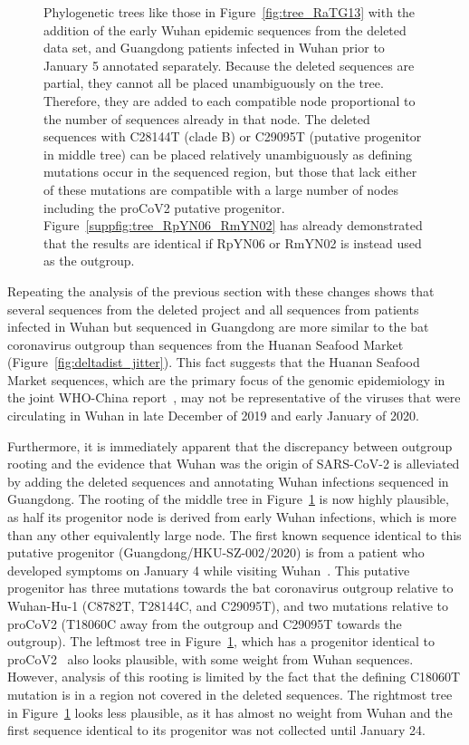 \documentclass[9pt,twocolumn,twoside]{gsajnl_modified}
\begin{document}
\begin{figure}
{ }
 \caption{
Phylogenetic trees like those in Figure~\ref{fig:tree_RaTG13} with the addition of the early Wuhan epidemic sequences from the deleted data set, and Guangdong patients infected in Wuhan prior to January 5 annotated separately.
Because the deleted sequences are partial, they cannot all be placed unambiguously on the tree.
Therefore, they are added to each compatible node proportional to the number of sequences already in that node.
The deleted sequences with C28144T (clade B) or C29095T (putative progenitor in middle tree) can be placed relatively unambiguously as defining mutations occur in the sequenced region, but those that lack either of these mutations are compatible with a large number of nodes including the proCoV2 putative progenitor.
 Figure~\ref{suppfig:tree_RpYN06_RmYN02} has already demonstrated that the results are identical if RpYN06 or RmYN02 is instead used as the outgroup.
\label{fig:tree_with_deleted}
 }
 \end{figure}

Repeating the analysis of the previous section with these changes shows that several sequences from the deleted project and all sequences from patients infected in Wuhan but sequenced in Guangdong are more similar to the bat coronavirus outgroup than sequences from the Huanan Seafood Market (Figure~\ref{fig:deltadist_jitter}).
This fact suggests that the Huanan Seafood Market sequences, which are the primary focus of the genomic epidemiology in the joint WHO-China report~\citep{WHO2021origins}, may not be representative of the viruses that were circulating in Wuhan in late December of 2019 and early January of 2020.

Furthermore, it is immediately apparent that the discrepancy between outgroup rooting and the evidence that Wuhan was the origin of SARS-CoV-2 is alleviated by adding the deleted sequences and annotating Wuhan infections sequenced in Guangdong.
The rooting of the middle tree in Figure~\ref{fig:tree_with_deleted} is now highly plausible, as half its progenitor node is derived from early Wuhan infections, which is more than any other equivalently large node.
The first known sequence identical to this putative progenitor (Guangdong/HKU-SZ-002/2020) is from a patient who developed symptoms on January 4 while visiting Wuhan~\citep{chan2020familial}.
This putative progenitor has three mutations towards the bat coronavirus outgroup relative to Wuhan-Hu-1 (C8782T, T28144C, and C29095T), and two mutations relative to proCoV2 (T18060C away from the outgroup and C29095T towards the outgroup).
The leftmost tree in Figure~\ref{fig:tree_with_deleted}, which has a progenitor identical to proCoV2~\citep{kumar2021evolutionary} also looks plausible, with some weight from Wuhan sequences.
However, analysis of this rooting is limited by the fact that the defining C18060T mutation is in a region not covered in the deleted sequences.
The rightmost tree in Figure~\ref{fig:tree_with_deleted} looks less plausible, as it has almost no weight from Wuhan and the first sequence identical to its progenitor was not collected until January 24.
\end{document}
